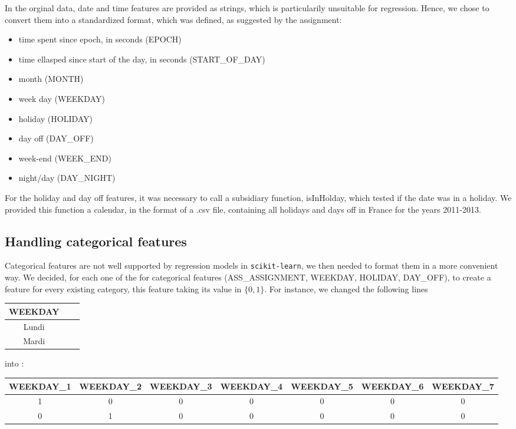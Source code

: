 \documentclass[a4paper,10pt]{article}
\begin{document}
    In the orginal data, date and time features are provided as strings, which is particularily unsuitable for regression. Hence, we chose to convert them into a standardized format, which was defined, as suggested by the assignment:
      \begin{itemize}
        \item time spent since epoch, in seconds (EPOCH)
        \item time ellasped since start of the day, in seconds (START\_OF\_DAY)
        \item month (MONTH)
        \item week day (WEEKDAY)
        \item holiday (HOLIDAY)
        \item day off (DAY\_OFF)
        \item week-end (WEEK\_END)
        \item night/day (DAY\_NIGHT)
      \end{itemize}

    For the holiday and day off features, it was necessary to call a subsidiary function, isInHolday, which tested if the date was in a holiday. We provided this function a calendar, in the format of a .csv file, containing all holidays and days off in France for the years 2011-2013.

    \subsection{Handling categorical features}

    Categorical features are not well supported by regression models in {\tt scikit-learn}, we then needed to format them in a more convenient way. We decided, for each one of the for categorical features (ASS\_ASSIGNMENT, WEEKDAY, HOLIDAY, DAY\_OFF), to create a feature for every existing category, this feature taking its value in $\{0,1\}$. For instance, we changed the following lines
    \begin{center}
    {\footnotesize
      \begin{tabular}{|c|c|c|}
        \hline
        WEEKDAY \\
        \hline
        Lundi \\
        \hline
        Mardi \\
        \hline
      \end{tabular}}
    \end{center}
    into :
    \begin{center}
      {\footnotesize
        \begin{tabular}{|c|c|c|c|c|c|c|}
          \hline
          WEEKDAY\_1 & WEEKDAY\_2 & WEEKDAY\_3 & WEEKDAY\_4 & WEEKDAY\_5 & WEEKDAY\_6 & WEEKDAY\_7 \\
          \hline
          1 & 0 & 0 & 0 & 0 & 0 & 0 \\
          \hline
          0 & 1 & 0 & 0 & 0 & 0 & 0 \\
          \hline
        \end{tabular}
      }
    \end{center}
\end{document}
